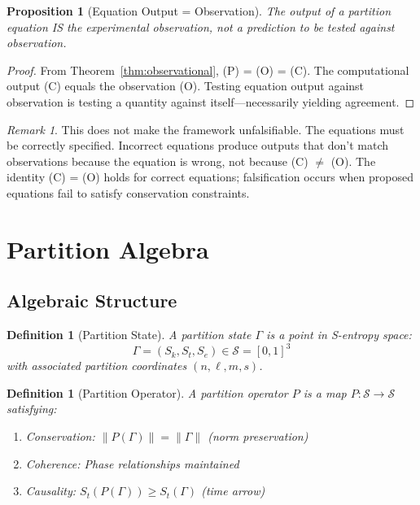\documentclass[aps,prd,twocolumn,superscriptaddress,floatfix,nofootinbib]{revtex4-2}
\newtheorem{definition}[theorem]{Definition}
\newtheorem{proposition}[theorem]{Proposition}
\theoremstyle{remark}
\newtheorem{remark}[theorem]{Remark}
\newcommand{\Sk}{S_k}
\newcommand{\St}{S_t}
\newcommand{\Se}{S_e}
\newcommand{\Sspace}{\mathcal{S}}
\newcommand{\Pop}{P}
\newcommand{\Gstate}{\Gamma}
\begin{document}
\begin{proposition}[Equation Output = Observation]
\label{prop:eq_output}
The output of a partition equation IS the experimental observation, not a prediction to be tested against observation.
\end{proposition}

\begin{proof}
From Theorem~\ref{thm:observational}, (P) = (O) = (C). The computational output (C) equals the observation (O). Testing equation output against observation is testing a quantity against itself---necessarily yielding agreement.
\end{proof}

\begin{remark}
This does not make the framework unfalsifiable. The equations must be correctly specified. Incorrect equations produce outputs that don't match observations because the equation is wrong, not because (C) $\neq$ (O). The identity (C) = (O) holds for correct equations; falsification occurs when proposed equations fail to satisfy conservation constraints.
\end{remark}

\section{Partition Algebra}
\label{sec:algebra}

\subsection{Algebraic Structure}

\begin{definition}[Partition State]
\label{def:partition_state}
A partition state $\Gstate$ is a point in S-entropy space:
\begin{equation}
\Gstate = (\Sk, \St, \Se) \in \Sspace = [0,1]^3
\end{equation}
with associated partition coordinates $(n, \ell, m, s)$.
\end{definition}

\begin{definition}[Partition Operator]
\label{def:partition_operator}
A partition operator $\Pop$ is a map $\Pop: \Sspace \to \Sspace$ satisfying:
\begin{enumerate}
\item Conservation: $\|\Pop(\Gstate)\| = \|\Gstate\|$ (norm preservation)
\item Coherence: Phase relationships maintained
\item Causality: $\St(\Pop(\Gstate)) \geq \St(\Gstate)$ (time arrow)
\end{enumerate}
\end{definition}
\end{document}
